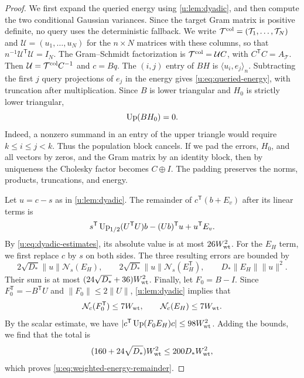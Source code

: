 \begin{proof}
We first expand the queried energy using \cref{u:lem:dyadic}, and then compute the two conditional Gaussian variances. Since the target Gram matrix is positive definite, no query uses the deterministic fallback. We write $\mathcal T^{\rm col}=(\mathcal T_1,\ldots,\mathcal T_N)$ and $\mathcal U=(u_1,\ldots,u_N)$ for the $n\times N$ matrices with these columns, so that $n^{-1}\mathcal U^{\mathsf T}\mathcal U=I_N$. The Gram--Schmidt factorization is $\mathcal T^{\rm col}=\mathcal U C$, with $C^{\mathsf T}C=A_{\mathcal T}$. Then $\mathcal U=\mathcal T^{\rm col}C^{-1}$ and $c=Bq$. The $(i,j)$ entry of $BH$ is $\langle u_i,e_j\rangle_n$. Subtracting the first $j$ query projections of $e_j$ in the energy gives \eqref{u:eq:queried-energy}, with truncation after multiplication. Since $B$ is lower triangular and $H_0$ is strictly lower triangular,
\begin{equation}\label{u:eq:population-triangle-cancellation}
 \operatorname{Up}(BH_0)=0.
\end{equation}
Indeed, a nonzero summand in an entry of the upper triangle would require $k\le i\le j<k$. Thus the population block cancels. If we pad the errors, $H_0$, and all vectors by zeros, and the Gram matrix by an identity block, then by uniqueness the Cholesky factor becomes $C\oplus I$. The padding preserves the norms, products, truncations, and energy.

Let $u=c-s$ as in \cref{u:lem:dyadic}. The remainder of $c^{\mathsf T}(b+E_v)$ after its linear terms is
\[
 s^{\mathsf T}\operatorname{Up}_{1/2}(U^{\mathsf T}U)b-(Ub)^{\mathsf T}u+u^{\mathsf T}E_v.
\]
By \eqref{u:eq:dyadic-estimates}, its absolute value is at most $26W_{\rm wt}^2$. For the $E_H$ term, we first replace $c$ by $s$ on both sides. The three resulting errors are bounded by
\[
 2\sqrt{D_*}\|u\|\mathcal N_s(E_H),\qquad
 2\sqrt{D_*}\|u\|\mathcal N_s(E_H^{\mathsf T}),\qquad
 D_*\|E_H\|\|u\|^2.
\]
Their sum is at most $(24\sqrt{D_*}+36)W_{\rm wt}^2$. Finally, let $F_0=B-I$. Since $F_0^{\mathsf T}=-B^{\mathsf T}U$ and $\|F_0\|\le2\|U\|$, \cref{u:lem:dyadic} implies that
\[
 \mathcal N_c(F_0^{\mathsf T})\le7W_{\rm wt},\qquad
 \mathcal N_c(E_H)\le7W_{\rm wt}.
\]
By the scalar estimate, we have $|c^{\mathsf T}\operatorname{Up}(F_0E_H)c|\le98W_{\rm wt}^2$. Adding the bounds, we find that the total is
\[
 (160+24\sqrt{D_*})W_{\rm wt}^2\le200D_*W_{\rm wt}^2,
\]
which proves \eqref{u:eq:weighted-energy-remainder}.


\end{proof}
